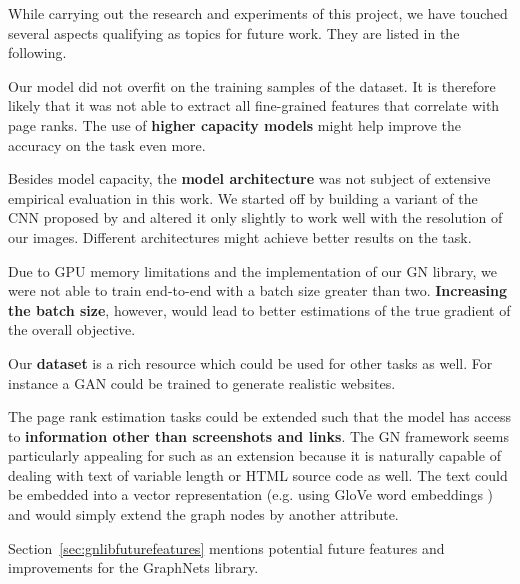 While carrying out the research and experiments of this project, we have touched several aspects qualifying as topics for future work. They are listed in the following.

Our model did not overfit on the training samples of the dataset. It is therefore likely that it was not able to extract all fine-grained features that correlate with page ranks. The use of \textbf{higher capacity models} might help improve the accuracy on the task even more.

Besides model capacity, the \textbf{model architecture} was not subject of extensive empirical evaluation in this work. We started off by building a variant of the CNN proposed by \cite{beltramelli:pix2code} and altered it only slightly to work well with the resolution of our images. Different architectures might achieve better results on the task.

Due to GPU memory limitations and the implementation of our GN library, we were not able to train end-to-end with a batch size greater than two. \textbf{Increasing the batch size}, however, would lead to better estimations of the true gradient of the overall objective.

Our \textbf{dataset} is a rich resource which could be used for other tasks as well. For instance a GAN \cite{goodfellow2014generative} could be trained to generate realistic websites.

The page rank estimation tasks could be extended such that the model has access to \textbf{information other than screenshots and links}. The GN framework seems particularly appealing for such as an extension because it is naturally capable of dealing with text of variable length or HTML source code as well. The text could be embedded into a vector representation (e.g. using GloVe word embeddings \cite{pennington2014:glove}) and would simply extend the graph nodes by another attribute.

Section~\ref{sec:gnlibfuturefeatures} mentions potential future features and improvements for the GraphNets library.
